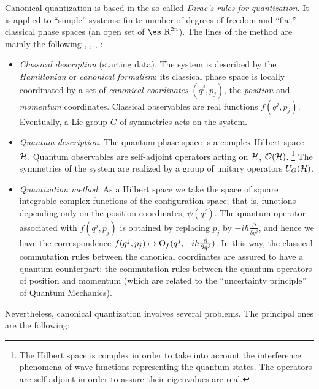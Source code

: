 \documentclass[12pt]{article}
\theoremstyle{plain}
\def\derpar#1#2{\frac{\partial{#1}}{\partial{#2}}}
\def\H{{\cal H}}
\def\Op{{\rm O}}
\def\Real{\mbox{\es R}}
\begin{document}
Canonical quantization is based in the so-called {\it Dirac's rules for
quantization}.
It is applied to ``simple'' systems:
finite number of degrees of freedom and
``flat'' classical phase spaces (an open set of $\Real^{2n}$).
The lines of the method are mainly the following
\cite{AM-78}, \cite{CDL-77}, \cite{Di-pqm}, \cite{GP-78}:
\begin{itemize}
\item
{\it Classical description} (starting data).
The system is described by the {\it Hamiltonian} or {\it canonical
formalism}:
its classical phase space is locally coordinated
by a set of {\it canonical coordinates} $(q^j,p_j)$,
the {\it position} and {\it momentum} coordinates.
Classical observables are real functions $f(q^j,p_j)$.
Eventually, a Lie group $G$ of symmetries acts on the system.
\item
{\it Quantum description}.
The quantum phase space is a complex Hilbert space $\H$.
Quantum observables are self-adjoint operators acting on $\H$, ${\cal
O}(\H )$.%
\footnote{
The Hilbert space is complex in order to take into account the
interference phenomena of wave functions representing the quantum
states.
The operators are self-adjoint in order to assure their eigenvalues are
real.}
The symmetries of the system are realized by a group of unitary
operators $U_G(\H )$.
\item
{\it Quantization method}.
As a Hilbert space we take the space of square integrable complex
functions
of the configuration space; that is, functions depending only on the
position coordinates,
$\psi(q^j)$. The quantum operator associated with $f(q^j,p_j)$
is obtained by replacing $p_j$ by $-i\hbar \derpar{}{q^j}$,
and hence we have the correspondence
$f(q^j,p_j) \mapsto \Op_f(q^j,-i\hbar \derpar{}{q^j})$.
In this way, the classical commutation rules
between the canonical coordinates are assured to have
a quantum counterpart: the commutation rules
between the quantum operators of position and momentum
(which are related to the ``uncertainty principle'' of Quantum
Mechanics).
\end{itemize}
Nevertheless, canonical quantization involves several problems.
The principal ones are the following:
\end{document}
